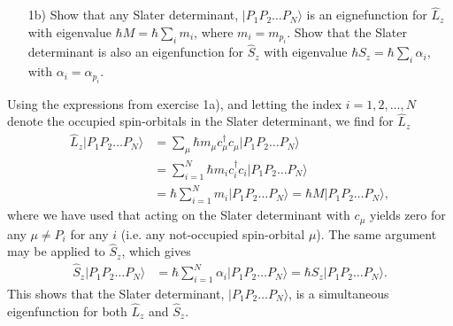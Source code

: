 \documentclass[a4paper]{article}
\newcommand{\nn}{\nonumber}
\renewcommand{\L}{\hat{L}_z}
\renewcommand{\S}{\hat{S}_z}
\newcommand{\slater}{|P_1P_2\dots P_N\rangle}
\begin{document}
\begin{exframe}
\begin{itemize}
  \item[1b)] Show that any Slater determinant, $|P_1P_2\dots P_N\rangle$ is an eignefunction for $\L$ with eigenvalue $\hbar M=\hbar\sum_i m_i$, where $m_i=m_{p_i}$. Show that the Slater determinant is also an eigenfunction for $\S$ with eigenvalue $\hbar S_z=\hbar\sum_i\alpha_i$, with $\alpha_i=\alpha_{p_i}$.
\end{itemize}
\end{exframe}
Using the expressions from exercise 1a), and letting the index $i=1,2,\dots,N$ denote the occupied spin-orbitals in the Slater determinant, we find for $\L$
\begin{align}
\L \slater  &= \sum_{\mu} \hbar m_\mu c^\dagger_\mu c_\mu \slater \nn\\
            &= \sum_{i=1}^N \hbar  m_i c^\dagger_i c_i \slater \nn\\
            &= \hbar \sum_{i=1}^N m_i \slater = \hbar M \slater,
\end{align}
where we have used that acting on the Slater determinant with $c_\mu$ yields zero for any $\mu\not=P_i$ for any $i$ (i.e. any not-occupied spin-orbital $\mu$). The same argument may be applied to $\S$, which gives
\begin{align}
\S \slater &= \hbar \sum_{i=1}^N \alpha_i \slater = \hbar S_z \slater.
\end{align}
This shows that the Slater determinant, $\slater$, is a simultaneous eigenfunction for both $\L$ and $\S$.
\end{document}
